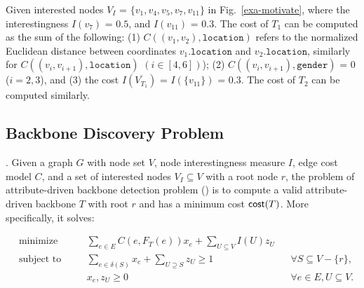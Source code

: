 {\begin{example}
Given interested nodes $V_I$ = $\{v_1, v_4, v_5, v_7, v_{11}\}$
in Fig.~\ref{exa-motivate}, where
the interestingness $I(v_7)$ = $0.5$,
and $I(v_{11})$ = $0.3$. The cost
of $T_1$ can be computed as the sum of
the following:
(1) $C((v_1,v_2), \texttt{location})$
refers to the normalized Euclidean distance between
coordinates $v_1.\texttt{location}$ and  $v_2.\texttt{location}$,
similarly for $C((v_i,v_{i+1}), \texttt{location})$ $(i\in[4,6])$);
(2) $C((v_i, v_{i+1}), \texttt{gender})$ = $0$ ($i={2,3}$),
and (3) the cost $I(\overline{V_{T_1}})$
= $I(\{v_{11}\})$ = $0.3$.
The cost of $T_2$ can be computed similarly.
\end{example}



\vspace{-3ex}
\subsection{Backbone Discovery Problem}
\label{sec-problem}

\vspace{-1ex}
. Given a graph $G$
with node set $V$,
node interestingness measure $I$, edge cost
model $C$, and a set of interested nodes $V_I\subseteq V$
with a root node $r$,
the problem of attribute-driven backbone
detection problem (\abd) is to compute a valid attribute-driven backbone $T$ with root $r$
and has a minimum cost  ${\mathsf{cost}}(T)$.
More specifically, it solves:

\setlength{\abovedisplayskip}{3pt}
\setlength{\belowdisplayskip}{3pt}

\begin{equation*}
\label{eqn_ABD_primal}
\begin{alignedat}{3}
&\textrm{minimize} \quad && \sum_{e\in E}C(e,F_T(e))x_e+\sum_{U \subseteq V}I(U)z_U\\
&\textrm{subject to} \quad &&\sum_{e \in \delta(S)}x_e + \sum_{U \supseteq S}z_U \geq 1 \quad && \forall S \subseteq V - \{r\},\\
&\quad &&x_e,z_U \geq 0 &&\forall e \in E, U \subseteq V.
\end{alignedat}
\end{equation*}

}
